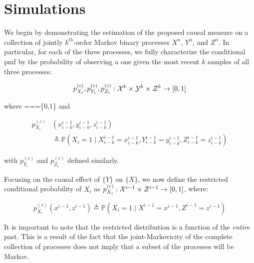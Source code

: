 \section{Simulations}

\begin{comment}
- Application to conditional bernoulli model using CTW algorithm (Fig 1)
- Explicit derivation of bounds and computation of regret
- Use changing environment meta algorithm for changing parameters to demonstrate that it appears to work even though theorem doesn't apply (Fig 2)
\end{comment}

We begin by demonstrating the estimation of the proposed causal measure on a collection of jointly $k^{th}$-order Markov binary processes $X^n$, $Y^n$, and $Z^n$. In particular, for each of the three processes, we fully characterize the conditional pmf by the probability of observing a one given the most recent $k$ samples of all three processes:

\begin{equation}
p^{(c)}_{X_i},p^{(c)}_{Y_i},p^{(c)}_{Z_i} : \mathcal{X}^k \times \mathcal{Y}^k \times \mathcal{Z}^k \rightarrow [0,1]
\end{equation}

\noindent where ===\{0,1\} and

\begin{equation*}
\begin{aligned}
p^{(c)}_{X_i}&(x_{i-k}^{i-1},y_{i-k}^{i-1},z_{i-k}^{i-1}) \\
&\triangleq \mathbb{P}(X_i = 1 \mid X_{i-k}^{i-1} = x_{i-k}^{i-1},Y_{i-k}^{i-1} = y_{i-k}^{i-1},Z_{i-k}^{i-1} = z_{i-k}^{i-1})
\end{aligned}
\end{equation*}

\noindent with $p^{(c)}_{Y_i}$ and $p^{(c)}_{Z_i}$ defined similarly.

Focusing on the causal effect of $\{Y\}$ on $\{X\}$, we now define the restricted conditional probability of $X_i$ as $p_{X_i}^{(r)}:\mathcal{X}^{i-1} \times \mathcal{Z}^{i-1} \rightarrow [0,1]$, where:

\begin{equation*}
p^{(r)}_{X_i}(x^{i-1},z^{i-1})
\triangleq \mathbb{P}(X_i = 1 \mid X^{i-1} = x^{i-1},Z^{i-1} = z^{i-1})
\end{equation*}

It is important to note that the restricted distribution is a function of the \emph{entire} past. This is a result of the fact that the joint-Markovicity of the complete collection of processes does not imply that a subset of the processes will be Markov.

